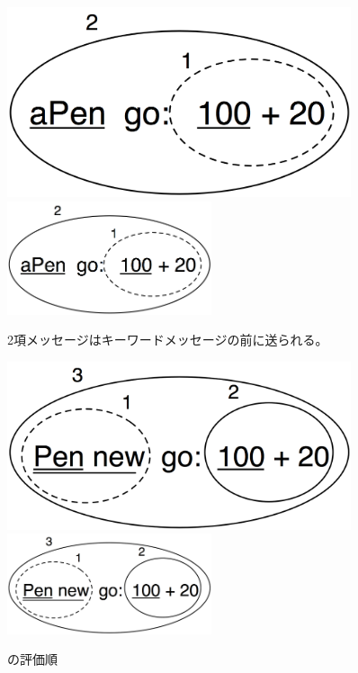 \documentclass[a4paper,10pt,twoside]{book}
\begin{document}
\begin{figure}[htb]
\begin{minipage}{0.48\textwidth}
	\ifluluelse
		{\centerline{\includegraphics[width=0.9\textwidth]{uKeyBin}}}
		{\centerline{\includegraphics[width=6cm]{uKeyBin}}}
	\caption{2項メッセージはキーワードメッセージの前に送られる。}
\end{minipage}
\hfill
\begin{minipage}{0.48\textwidth}
	\begin{center}
	\ifluluelse
		{\includegraphics[width=0.9\textwidth]{uunKeyBin}}
		{\includegraphics[width=6cm]{uunKeyBin}}
\caption{の評価順}
\end{center}
\end{minipage}
\end{figure}
\end{document}
